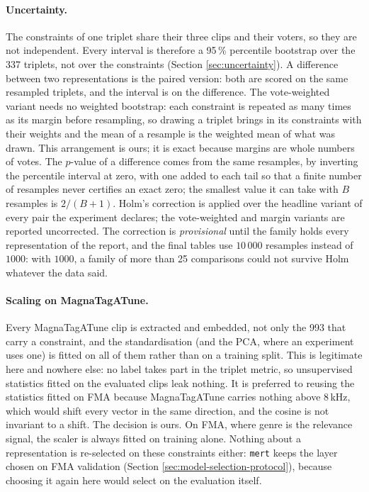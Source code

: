 \paragraph{Uncertainty.} The constraints of one triplet share their three clips
and their voters, so they are not independent. Every interval is therefore a
95\,\% percentile bootstrap over the 337 triplets, not over the constraints
(Section \ref{sec:uncertainty}). A difference between two representations is
the paired version: both are scored on the same resampled triplets, and the
interval is on the difference. The vote-weighted variant needs no weighted
bootstrap: each constraint is repeated as many times as its margin before
resampling, so drawing a triplet brings in its constraints with their weights
and the mean of a resample is the weighted mean of what was drawn. This
arrangement is ours; it is exact because margins are whole numbers of votes.
The $p$-value of a difference comes from the same resamples, by inverting the
percentile interval at zero, with one added to each tail so that a finite
number of resamples never certifies an exact zero; the smallest value it can
take with $B$ resamples is $2/(B+1)$. Holm's correction is applied over the
headline variant of every pair the experiment declares; the vote-weighted and
margin variants are reported uncorrected. The correction is
\emph{provisional} until the family holds every representation of the report,
and the final tables use $10\,000$ resamples instead of $1000$: with $1000$,
a family of more than 25 comparisons could not survive Holm whatever the data
said.

\paragraph{Scaling on MagnaTagATune.} Every MagnaTagATune clip is extracted and
embedded, not only the 993 that carry a constraint, and the standardisation
(and the PCA, where an experiment uses one) is fitted on all of them rather
than on a training split. This is legitimate here and nowhere else: no label
takes part in the triplet metric, so unsupervised statistics fitted on the
evaluated clips leak nothing. It is preferred to reusing the statistics fitted
on FMA because MagnaTagATune carries nothing above 8\,kHz, which would shift
every vector in the same direction, and the cosine is not invariant to a
shift. The decision is ours. On FMA, where genre is the relevance signal, the
scaler is always fitted on training alone. Nothing about a representation is
re-selected on these constraints either: \texttt{mert} keeps the layer chosen
on FMA validation (Section \ref{sec:model-selection-protocol}), because
choosing it again here would select on the evaluation itself.

